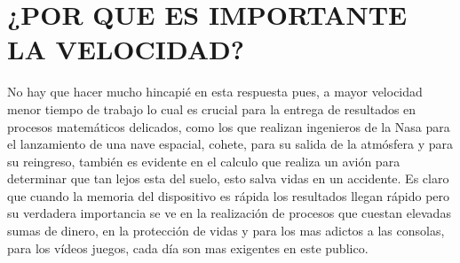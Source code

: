\documentclass{article}
\begin{document}
\section{¿POR QUE ES IMPORTANTE LA VELOCIDAD?}
No hay que hacer mucho hincapié en esta respuesta pues, a mayor velocidad menor tiempo de trabajo lo cual es crucial para la entrega de resultados en procesos matemáticos delicados, como los que realizan ingenieros de la Nasa para el lanzamiento de una nave espacial, cohete, para su salida de la atmósfera y para su reingreso, también es evidente en el calculo que realiza un avión para determinar que tan lejos esta del suelo, esto salva vidas en un accidente. Es claro que cuando la memoria del dispositivo es rápida los resultados llegan rápido pero su verdadera importancia se ve en la realización de procesos que cuestan elevadas sumas de dinero, en la protección de vidas y para los mas adictos a las consolas, para los vídeos juegos, cada día son mas exigentes en este publico. 
\newpage


\end{document}
